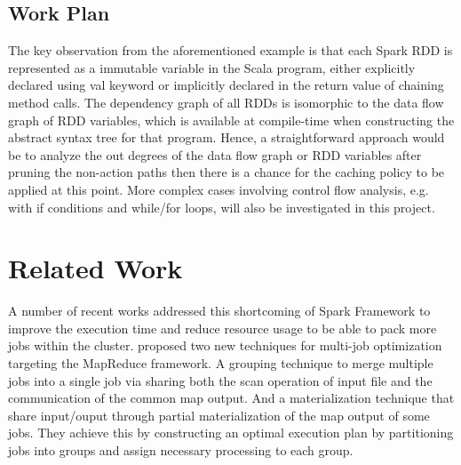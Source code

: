 \documentclass[conference]{sig-alternate-05-2015}
\begin{document}
\subsection{Work Plan}
The key observation from the aforementioned example is that each Spark RDD is represented as a immutable variable in the Scala program, either explicitly declared using val keyword or implicitly declared in the return value of chaining method calls. The dependency graph of all RDDs is isomorphic to the data flow graph of RDD variables, which is available at compile-time when constructing the abstract syntax tree for that program. Hence, a straightforward approach would be to analyze the out degrees of the data flow graph or RDD variables after pruning the non-action paths then there is a chance for the caching policy to be applied at this point. More complex cases involving control flow analysis, e.g. with if conditions and while/for loops, will also be investigated in this project.

\section{Related Work}
A number of recent works addressed this shortcoming of Spark Framework to improve the execution time and reduce resource usage to be able to pack more jobs within the cluster. \cite{Wang:2013du} proposed two new techniques for multi-job optimization targeting the MapReduce framework. A grouping technique to merge multiple jobs into a single job via sharing both the scan operation of input file and the communication of the common map output. And a materialization technique that share input/ouput through partial materialization of the map output of some jobs. They achieve this by constructing an optimal execution plan by partitioning jobs into groups and assign necessary processing to each group. 




\end{document}

